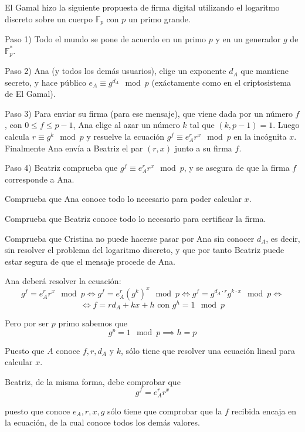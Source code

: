 \begin{problem}[3]
 El Gamal hizo la siguiente propuesta de firma digital utilizando
el logaritmo discreto sobre un cuerpo $\mathbb{F}_p$ con $p$ un primo
grande.

Paso 1) Todo el mundo se pone de acuerdo en un primo $p$ y en un
generador $g$ de $\mathbb{F}_p^*$.

Paso 2) Ana (y todos los demás usuarios), elige un exponente $d_A$
que mantiene secreto, y hace público $e_A\equiv g^{d_A}\mod p$
(exáctamente como en el criptosistema de El Gamal).

Paso 3) Para enviar su firma (para ese mensaje), que viene dada
por un número $f$, con $0\le f\le p-1$, Ana elige al azar un
número $k$ tal que $(k,p-1)=1$. Luego calcula $r\equiv g^k \mod p$
y resuelve la ecuación $g^f\equiv e_A^r r^x \mod p$ en la
incógnita $x$. Finalmente Ana envía a Beatriz el par $(r,x)$ junto
a su firma $f$.

Paso 4)  Beatriz comprueba que $g^f\equiv e_A^r r^x \mod p$, y se
asegura de que la firma $f$ corresponde a Ana.

\ppart Comprueba que Ana conoce todo lo necesario para
poder calcular $x$.

\ppart Comprueba que Beatriz conoce todo lo necesario para certificar
la firma.

\ppart Comprueba que Cristina no puede hacerse pasar por Ana sin
conocer $d_A$, es decir, sin resolver el problema del logaritmo
discreto, y que por tanto Beatriz puede estar segura de que el
mensaje procede de Ana.

\solution


\spart

Ana deberá resolver la ecuación:
\[g^f=e_A^rr^x \mod p\iff g^f = e_A^r(g^k)^x \mod p\iff g^f=g^{d_A\cdot r}g^{k\cdot x} \mod p\iff\]
\[\iff f = rd_A+kx + h \text{ con } g^h=1 \mod p\]


Pero por ser $p$ primo sabemos que
\[g^p =1 \mod p \implies h = p\]

Puesto que $A$ conoce $f,r,d_A$ y $k$, sólo tiene que resolver una ecuación lineal para calcular $x$.

\spart

Beatriz, de la misma forma, debe comprobar que
\[g^f=e_A^rr^x\]

puesto que conoce $e_A,r,x,g$ sólo tiene que comprobar que la $f$ recibida encaja en la ecuación, de la cual conoce todos los demás valores.

\spart


\end{problem}

